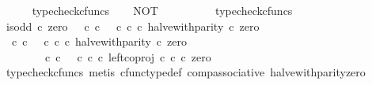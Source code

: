 \begin{isabellebody}
\ \ \ \ \isamarkupfalse%
\ typecheck{\isacharunderscore}{\kern0pt}cfuncs\isanewline
\ \ \isamarkupfalse%
\ {\isachardoublequoteopen}NOT\ {\isacharcolon}{\kern0pt}\ {\isasymOmega}\ {\isasymrightarrow}\ {\isasymOmega}{\isachardoublequoteclose}\isanewline
\ \ \ \ \isamarkupfalse%
\ typecheck{\isacharunderscore}{\kern0pt}cfuncs\isanewline
\isanewline
\ \ \isamarkupfalse%
\ {\isachardoublequoteopen}is{\isacharunderscore}{\kern0pt}odd\ {\isasymcirc}\isactrlsub c\ zero\ {\isacharequal}{\kern0pt}\ {\isacharparenleft}{\kern0pt}{\isacharparenleft}{\kern0pt}{\isasymf}\ {\isasymcirc}\isactrlsub c\ {\isasymbeta}\isactrlbsub {\isasymnat}\isactrlsub c\isactrlesub {\isacharparenright}{\kern0pt}\ {\isasymamalg}\ {\isacharparenleft}{\kern0pt}{\isasymt}\ {\isasymcirc}\isactrlsub c\ {\isasymbeta}\isactrlbsub {\isasymnat}\isactrlsub c\isactrlesub {\isacharparenright}{\kern0pt}\ {\isasymcirc}\isactrlsub c\ halve{\isacharunderscore}{\kern0pt}with{\isacharunderscore}{\kern0pt}parity{\isacharparenright}{\kern0pt}\ {\isasymcirc}\isactrlsub c\ zero{\isachardoublequoteclose}\isanewline
\ \ \isamarkupfalse%
\ {\isacharminus}{\kern0pt}\isanewline
\ \ \ \ \isamarkupfalse%
\ {\isachardoublequoteopen}{\isacharparenleft}{\kern0pt}{\isacharparenleft}{\kern0pt}{\isasymf}\ {\isasymcirc}\isactrlsub c\ {\isasymbeta}\isactrlbsub {\isasymnat}\isactrlsub c\isactrlesub {\isacharparenright}{\kern0pt}\ {\isasymamalg}\ {\isacharparenleft}{\kern0pt}{\isasymt}\ {\isasymcirc}\isactrlsub c\ {\isasymbeta}\isactrlbsub {\isasymnat}\isactrlsub c\isactrlesub {\isacharparenright}{\kern0pt}\ {\isasymcirc}\isactrlsub c\ halve{\isacharunderscore}{\kern0pt}with{\isacharunderscore}{\kern0pt}parity{\isacharparenright}{\kern0pt}\ {\isasymcirc}\isactrlsub c\ zero\isanewline
\ \ \ \ \ \ {\isacharequal}{\kern0pt}\ {\isacharparenleft}{\kern0pt}{\isasymf}\ {\isasymcirc}\isactrlsub c\ {\isasymbeta}\isactrlbsub {\isasymnat}\isactrlsub c\isactrlesub {\isacharparenright}{\kern0pt}\ {\isasymamalg}\ {\isacharparenleft}{\kern0pt}{\isasymt}\ {\isasymcirc}\isactrlsub c\ {\isasymbeta}\isactrlbsub {\isasymnat}\isactrlsub c\isactrlesub {\isacharparenright}{\kern0pt}\ {\isasymcirc}\isactrlsub c\ left{\isacharunderscore}{\kern0pt}coproj\ {\isasymnat}\isactrlsub c\ {\isasymnat}\isactrlsub c\ {\isasymcirc}\isactrlsub c\ zero{\isachardoublequoteclose}\isanewline
\ \ \ \ \ \ \isamarkupfalse%
\ {\isacharparenleft}{\kern0pt}typecheck{\isacharunderscore}{\kern0pt}cfuncs{\isacharcomma}{\kern0pt}\ metis\ cfunc{\isacharunderscore}{\kern0pt}type{\isacharunderscore}{\kern0pt}def\ comp{\isacharunderscore}{\kern0pt}associative\ halve{\isacharunderscore}{\kern0pt}with{\isacharunderscore}{\kern0pt}parity{\isacharunderscore}{\kern0pt}zero{\isacharparenright}{\kern0pt}\isanewline

\end{isabellebody}
